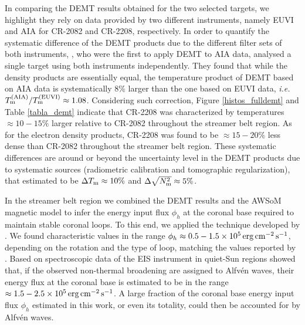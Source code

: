 \documentclass[namedreferences]{solarphysics}
\newcommand{\cm}{{\rm cm}}
\newcommand{\cminvs}{\cm^{-2}}
\newcommand{\erg}{{\rm erg}}
\newcommand{\s}{{\rm s}}
\newcommand{\Tm}{T_{\rm m}}
\newcommand{\Nsqm}{N^2_{{\rm m}}}
\newcommand{\sqravgN}{\sqrt{\Nsqm}}
\begin{document}
\begin{article}
In comparing the DEMT results obtained for the two selected targets, {we highlight} they rely on data provided by two different instruments, {namely EUVI and AIA for CR-2082 and CR-2208, respectively.} In order to quantify the systematic difference of the DEMT products {due to the different filter sets of} both instruments, \citet{nuevo_2015}, who were the first to apply DEMT to AIA data, {analysed} a single target using both instruments independently. They found that while the density {products are} essentially equal, the temperature product of DEMT based on AIA data is systematically 8\% larger than the one based on EUVI data, \textit{i.e.} $\Tm^{\rm(AIA)}/\Tm^{\rm(EUVI)} \approx 1.08$. Considering such correction, Figure \ref{histos_fulldemt} and Table \ref{tabla_demt} indicate that CR-2208 was {characterized by temperatures $\approx 10-15\%$ larger relative to CR-2082} throughout the streamer belt region. As for the electron density products, CR-2208 was found to be $\approx 15-20\%$ less dense than CR-2082 throughout the streamer belt region. These systematic differences are {around or beyond the uncertainty level in the DEMT products due to systematic sources (radiometric calibration and tomographic regularization), that \citet{lloveras_2017} {estimated to be $\Delta\Tm\approx 10\%$ and $\Delta\sqravgN\approx 5\%$}.}

{In the streamer belt region we combined the DEMT results and the AWSoM magnetic model to infer the energy input flux $\phi_h$ at the coronal base required to maintain stable coronal loops. To this end, we applied the technique developed by \citet{maccormack_2017}. We found characteristic values in the range $\phi_h\approx 0.5-1.5 \times 10^5\,\erg\,\cminvs\,\s^{-1}$, depending on the rotation and the type of {loop, matching the values reported by} \citet{maccormack_2017}. Based on spectroscopic data of the EIS instrument in quiet-Sun regions \citet{hahn_2014} showed that, if the observed non-thermal broadening are assigned to Alfvén waves, their energy flux at the coronal base is estimated to be in the range $\approx 1.5-2.5\times 10^5\,\erg\,\cminvs\,\s^{-1}$. A large fraction of the coronal base energy input flux $\phi_h$ estimated in this work, or even its totality, could then be accounted for by Alfvén waves.}


\end{article}
\end{document}
